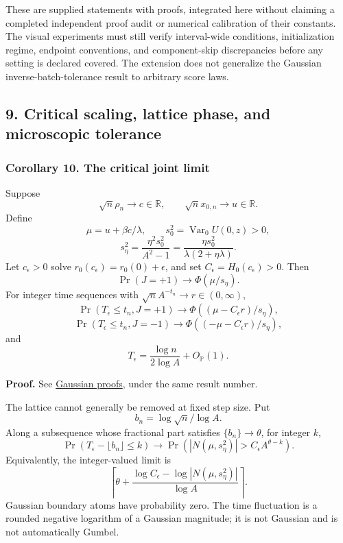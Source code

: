 These are supplied statements with proofs, integrated here without
claiming a completed independent proof audit or numerical calibration of
their constants. The visual experiments must still verify interval-wide
conditions, initialization regime, endpoint conventions, and
component-skip discrepancies before any setting is declared covered. The
extension does not generalize the Gaussian inverse-batch-tolerance
result to arbitrary score laws.

\subsection{9. Critical scaling, lattice phase, and microscopic
tolerance}\label{draft-critical-scaling-lattice-phase-and-microscopic-tolerance}

\subsubsection{Corollary 10. The critical joint
limit}\label{draft-corollary-10.-the-critical-joint-limit}

Suppose \[
\sqrt n\rho_n\to c\in\mathbb R,\qquad
\sqrt n x_{0,n}\to u\in\mathbb R.
\] Define \[
\mu=u+\beta c/\lambda,\qquad
s_0^2=\operatorname{Var}_0U(0,z)>0,
\] \[
s_\eta^2=\frac{\eta^2s_0^2}{A^2-1}
=\frac{\eta s_0^2}{\lambda(2+\eta\lambda)}.
\] Let \(c_\epsilon>0\) solve \(r_0(c_\epsilon)=r_0(0)+\epsilon\), and
set \(C_\epsilon=H_0(c_\epsilon)>0\). Then \[
\Pr(J=+1)\to\Phi(\mu/s_\eta).
\] For integer time sequences with
\(\sqrt n A^{-t_n}\to r\in(0,\infty)\), \[
\Pr(T_\epsilon\le t_n,J=+1)\to
\Phi((\mu-C_\epsilon r)/s_\eta),
\] \[
\Pr(T_\epsilon\le t_n,J=-1)\to
\Phi((-\mu-C_\epsilon r)/s_\eta),
\] and \[
T_\epsilon=\frac{\log n}{2\log A}+O_{\mathbb P}(1).
\]

\textbf{Proof.} See \href{gaussian_proofs.md}{Gaussian proofs}, under
the same result number.

The lattice cannot generally be removed at fixed step size. Put \[
b_n=\log\sqrt n/\log A.
\] Along a subsequence whose fractional part satisfies
\(\{b_n\}\to\theta\), for integer \(k\), \[
\Pr(T_\epsilon-\lfloor b_n\rfloor\le k)
\to\Pr(|N(\mu,s_\eta^2)|>C_\epsilon A^{\theta-k}).
\] Equivalently, the integer-valued limit is \[
\left\lceil\theta+
\frac{\log C_\epsilon-\log|N(\mu,s_\eta^2)|}{\log A}\right\rceil.
\] Gaussian boundary atoms have probability zero. The time fluctuation
is a rounded negative logarithm of a Gaussian magnitude; it is not
Gaussian and is not automatically Gumbel.

